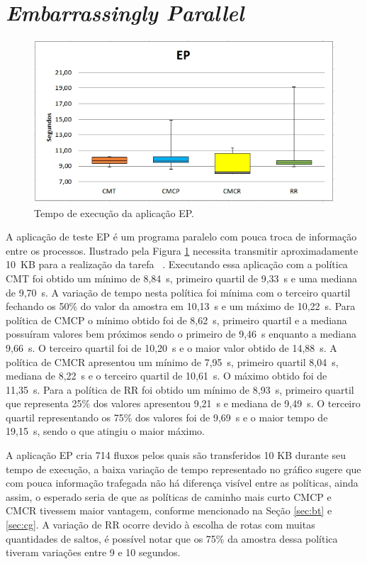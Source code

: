 \section{\textit{Embarrassingly Parallel}}
\label{sec:ep}
\begin{figure}[!htb]
	\caption{\label{fig:ep}Tempo de execução da aplicação EP.}
	\begin{center}
	    \includegraphics[scale=0.60]{imagens/ep.jpg}
	\end{center}
\end{figure}
A aplicação de teste EP é um programa paralelo com pouca troca de informação entre os processos. Ilustrado pela Figura \ref{fig:ep} necessita transmitir aproximadamente 10~KB para a realização da tarefa ~\cite{marcondes2016executing}. Executando essa aplicação com a política CMT foi obtido um mínimo de 8,84~s, primeiro quartil de 9,33~s e uma mediana de 9,70~s. A variação de tempo nesta política foi mínima com o terceiro quartil fechando os 50\% do valor da amostra em 10,13~s e um máximo de 10,22~s. Para política de CMCP o mínimo obtido foi de 8,62~s, primeiro quartil e a mediana possuíram valores bem próximos sendo o primeiro de 9,46~s enquanto a mediana 9,66~s. O terceiro quartil foi de 10,20~s e o maior valor obtido de 14,88~s. A política de CMCR apresentou um mínimo de 7,95~s, primeiro quartil 8,04~s, mediana de 8,22~s e o terceiro quartil de 10,61~s. O máximo obtido foi de 11,35~s. Para a política de RR  foi obtido um mínimo de 8,93~s, primeiro quartil que representa 25\% dos valores apresentou 9,21~s e mediana de 9,49~s. O terceiro quartil representando os 75\% dos valores foi de 9,69~s e o maior tempo de 19,15~s, sendo o que atingiu o maior máximo. 

A aplicação EP cria 714 fluxos pelos quais são transferidos 10 KB durante seu tempo de execução, a baixa variação de tempo representado no gráfico sugere que com pouca informação trafegada não há diferença visível entre as políticas, ainda assim, o esperado seria de que as políticas de caminho mais curto CMCP e CMCR tivessem maior vantagem, conforme mencionado na Seção \ref{sec:bt} e \ref{sec:cg}. A variação de RR ocorre devido à escolha de rotas com muitas quantidades de saltos, é possível notar que os 75\% da amostra dessa política tiveram variações entre 9 e 10 segundos.

